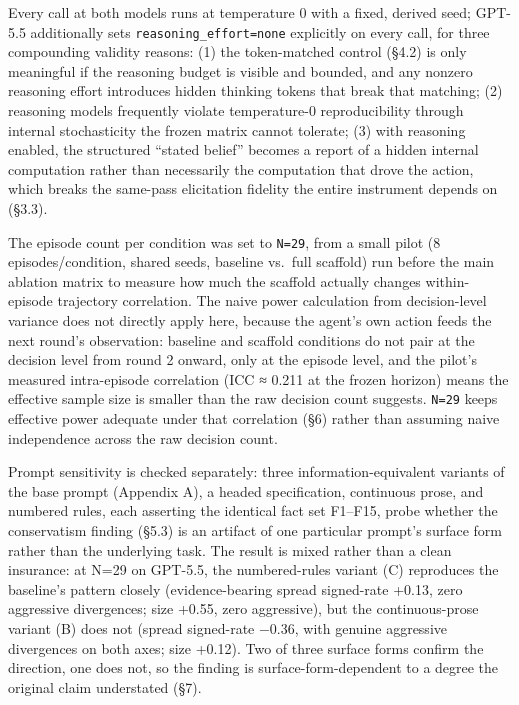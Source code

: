 \documentclass[
  11pt,
]{article}
\newcounter{none} %
\begin{document}
Every call at both models runs at temperature 0 with a fixed, derived seed; GPT-5.5 additionally sets \texttt{reasoning\_effort=\textquotesingle{}none\textquotesingle{}} explicitly on every call, for three compounding validity reasons: (1) the token-matched control (§4.2) is only meaningful if the reasoning budget is visible and bounded, and any nonzero reasoning effort introduces hidden thinking tokens that break that matching; (2) reasoning models frequently violate temperature-0 reproducibility through internal stochasticity the frozen matrix cannot tolerate; (3) with reasoning enabled, the structured ``stated belief'' becomes a report of a hidden internal computation rather than necessarily the computation that drove the action, which breaks the same-pass elicitation fidelity the entire instrument depends on (§3.3).

The episode count per condition was set to \texttt{N=29}, from a small pilot (8 episodes/condition, shared seeds, baseline vs.~full scaffold) run before the main ablation matrix to measure how much the scaffold actually changes within-episode trajectory correlation. The naive power calculation from decision-level variance does not directly apply here, because the agent's own action feeds the next round's observation: baseline and scaffold conditions do not pair at the decision level from round 2 onward, only at the episode level, and the pilot's measured intra-episode correlation (ICC ≈ 0.211 at the frozen horizon) means the effective sample size is smaller than the raw decision count suggests. \texttt{N=29} keeps effective power adequate under that correlation (§6) rather than assuming naive independence across the raw decision count.

Prompt sensitivity is checked separately: three information-equivalent variants of the base prompt (Appendix A), a headed specification, continuous prose, and numbered rules, each asserting the identical fact set F1--F15, probe whether the conservatism finding (§5.3) is an artifact of one particular prompt's surface form rather than the underlying task. The result is mixed rather than a clean insurance: at N=29 on GPT-5.5, the numbered-rules variant (C) reproduces the baseline's pattern closely (evidence-bearing spread signed-rate +0.13, zero aggressive divergences; size +0.55, zero aggressive), but the continuous-prose variant (B) does not (spread signed-rate −0.36, with genuine aggressive divergences on both axes; size +0.12). Two of three surface forms confirm the direction, one does not, so the finding is surface-form-dependent to a degree the original claim understated (§7).
\end{document}
